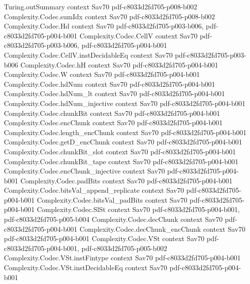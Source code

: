 \begin{theorem}
\proofstep
  {Turing.outSummary}
  {context}
  {Sav70}
  {pdf-c8033d2fd705-p008-b002}
\proofstep
  {Complexity.Codec.sumIdx}
  {context}
  {Sav70}
  {pdf-c8033d2fd705-p008-b002}
\proofstep
  {Complexity.Codec.Hd}
  {context}
  {Sav70}
  {pdf-c8033d2fd705-p003-b006,
    pdf-c8033d2fd705-p004-b001}
\proofstep
  {Complexity.Codec.CellV}
  {context}
  {Sav70}
  {pdf-c8033d2fd705-p003-b006,
    pdf-c8033d2fd705-p004-b001}
\proofstep
  {Complexity.Codec.CellV.instDecidableEq}
  {context}
  {Sav70}
  {pdf-c8033d2fd705-p003-b006}
\proofstep
  {Complexity.Codec.hH}
  {context}
  {Sav70}
  {pdf-c8033d2fd705-p004-b001}
\proofstep
  {Complexity.Codec.W}
  {context}
  {Sav70}
  {pdf-c8033d2fd705-p004-b001}
\proofstep
  {Complexity.Codec.hdNum}
  {context}
  {Sav70}
  {pdf-c8033d2fd705-p004-b001}
\proofstep
  {Complexity.Codec.hdNum_lt}
  {context}
  {Sav70}
  {pdf-c8033d2fd705-p004-b001}
\proofstep
  {Complexity.Codec.hdNum_injective}
  {context}
  {Sav70}
  {pdf-c8033d2fd705-p004-b001}
\proofstep
  {Complexity.Codec.chunkBit}
  {context}
  {Sav70}
  {pdf-c8033d2fd705-p004-b001}
\proofstep
  {Complexity.Codec.encChunk}
  {context}
  {Sav70}
  {pdf-c8033d2fd705-p004-b001}
\proofstep
  {Complexity.Codec.length_encChunk}
  {context}
  {Sav70}
  {pdf-c8033d2fd705-p004-b001}
\proofstep
  {Complexity.Codec.getD_encChunk}
  {context}
  {Sav70}
  {pdf-c8033d2fd705-p004-b001}
\proofstep
  {Complexity.Codec.chunkBit_slot}
  {context}
  {Sav70}
  {pdf-c8033d2fd705-p004-b001}
\proofstep
  {Complexity.Codec.chunkBit_tape}
  {context}
  {Sav70}
  {pdf-c8033d2fd705-p004-b001}
\proofstep
  {Complexity.Codec.encChunk_injective}
  {context}
  {Sav70}
  {pdf-c8033d2fd705-p004-b001}
\proofstep
  {Complexity.Codec.padBits}
  {context}
  {Sav70}
  {pdf-c8033d2fd705-p004-b001}
\proofstep
  {Complexity.Codec.bitsVal_append_replicate}
  {context}
  {Sav70}
  {pdf-c8033d2fd705-p004-b001}
\proofstep
  {Complexity.Codec.bitsVal_padBits}
  {context}
  {Sav70}
  {pdf-c8033d2fd705-p004-b001}
\proofstep
  {Complexity.Codec.SlSt}
  {context}
  {Sav70}
  {pdf-c8033d2fd705-p004-b001,
    pdf-c8033d2fd705-p005-b004}
\proofstep
  {Complexity.Codec.decChunk}
  {context}
  {Sav70}
  {pdf-c8033d2fd705-p004-b001}
\proofstep
  {Complexity.Codec.decChunk_encChunk}
  {context}
  {Sav70}
  {pdf-c8033d2fd705-p004-b001}
\proofstep
  {Complexity.Codec.VSt}
  {context}
  {Sav70}
  {pdf-c8033d2fd705-p004-b001,
    pdf-c8033d2fd705-p005-b002}
\proofstep
  {Complexity.Codec.VSt.instFintype}
  {context}
  {Sav70}
  {pdf-c8033d2fd705-p004-b001}
\proofstep
  {Complexity.Codec.VSt.instDecidableEq}
  {context}
  {Sav70}
  {pdf-c8033d2fd705-p004-b001}

\end{theorem}
